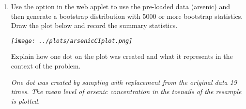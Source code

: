 \begin{enumerate}



\item 
 Use the  option in the web applet to use the pre-loaded data
 (arsenic) and then generate a
 bootstrap distribution with 5000 or more bootstrap statistics.  Draw the plot
 below and record the summary statistics.  %
\begin{students}
  \vspace{4cm}
\end{students}
\begin{key}
  {\it \texttt{[image: ../plots/arsenicCIplot.png]}}
\end{key}

Explain how one dot on the plot was created and what it represents in
the context of the problem.
\begin{students}
  \vspace{1cm}
\end{students}
\begin{key}
  {\it One dot was created by sampling with replacement from the
    original data 19 times.  The mean level of arsenic concentration
    in the toenails of the resample is plotted.}
\end{key}


\end{enumerate}
